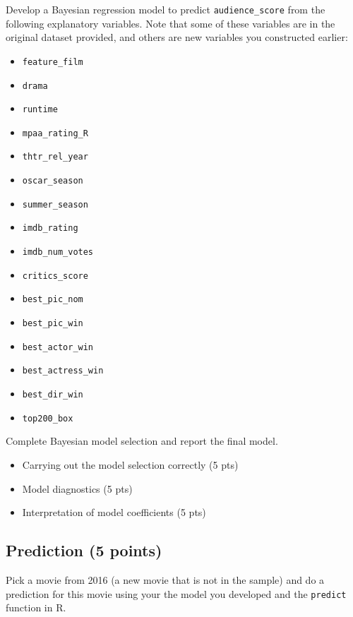 \documentclass[
]{article}
\providecommand{\tightlist}{%
  \setlength{\itemsep}{0pt}\setlength{\parskip}{0pt}}
\begin{document}
Develop a Bayesian regression model to predict \texttt{audience\_score}
from the following explanatory variables. Note that some of these
variables are in the original dataset provided, and others are new
variables you constructed earlier:

\begin{itemize}
\tightlist
\item
  \texttt{feature\_film}
\item
  \texttt{drama}
\item
  \texttt{runtime}
\item
  \texttt{mpaa\_rating\_R}
\item
  \texttt{thtr\_rel\_year}
\item
  \texttt{oscar\_season}
\item
  \texttt{summer\_season}
\item
  \texttt{imdb\_rating}
\item
  \texttt{imdb\_num\_votes}
\item
  \texttt{critics\_score}
\item
  \texttt{best\_pic\_nom}
\item
  \texttt{best\_pic\_win}
\item
  \texttt{best\_actor\_win}
\item
  \texttt{best\_actress\_win}
\item
  \texttt{best\_dir\_win}
\item
  \texttt{top200\_box}
\end{itemize}

Complete Bayesian model selection and report the final model.

\begin{itemize}
\tightlist
\item
  Carrying out the model selection correctly (5 pts)
\item
  Model diagnostics (5 pts)
\item
  Interpretation of model coefficients (5 pts)
\end{itemize}

\hypertarget{prediction-5-points}{%
\subsection{Prediction (5 points)}\label{prediction-5-points}}

Pick a movie from 2016 (a new movie that is not in the sample) and do a
prediction for this movie using your the model you developed and the
\texttt{predict} function in R.
\end{document}
